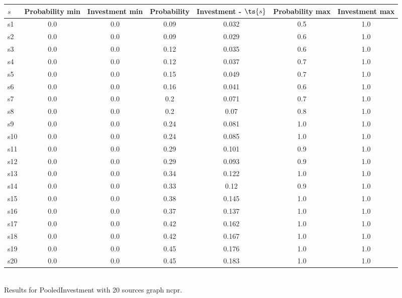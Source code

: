 \documentclass{article}
\begin{document}
\noindent\begin{tabular}{|l|c|c|c|c|c|c|}
\hline
$s$& Probability min & Investment min & Probability & Investment - $\ts{s}$ & Probability max & Investment max\\
\hline
s1 &0.0 & 0.0 & 0.09 & 0.032 & 0.5 & 1.0\\
\hline
s2 &0.0 & 0.0 & 0.09 & 0.029 & 0.6 & 1.0\\
\hline
s3 &0.0 & 0.0 & 0.12 & 0.035 & 0.6 & 1.0\\
\hline
s4 &0.0 & 0.0 & 0.12 & 0.037 & 0.7 & 1.0\\
\hline
s5 &0.0 & 0.0 & 0.15 & 0.049 & 0.7 & 1.0\\
\hline
s6 &0.0 & 0.0 & 0.16 & 0.041 & 0.6 & 1.0\\
\hline
s7 &0.0 & 0.0 & 0.2 & 0.071 & 0.7 & 1.0\\
\hline
s8 &0.0 & 0.0 & 0.2 & 0.07 & 0.8 & 1.0\\
\hline
s9 &0.0 & 0.0 & 0.24 & 0.081 & 1.0 & 1.0\\
\hline
s10 &0.0 & 0.0 & 0.24 & 0.085 & 1.0 & 1.0\\
\hline
s11 &0.0 & 0.0 & 0.29 & 0.101 & 0.9 & 1.0\\
\hline
s12 &0.0 & 0.0 & 0.29 & 0.093 & 0.9 & 1.0\\
\hline
s13 &0.0 & 0.0 & 0.34 & 0.122 & 1.0 & 1.0\\
\hline
s14 &0.0 & 0.0 & 0.33 & 0.12 & 0.9 & 1.0\\
\hline
s15 &0.0 & 0.0 & 0.38 & 0.145 & 1.0 & 1.0\\
\hline
s16 &0.0 & 0.0 & 0.37 & 0.137 & 1.0 & 1.0\\
\hline
s17 &0.0 & 0.0 & 0.42 & 0.162 & 1.0 & 1.0\\
\hline
s18 &0.0 & 0.0 & 0.42 & 0.167 & 1.0 & 1.0\\
\hline
s19 &0.0 & 0.0 & 0.45 & 0.176 & 1.0 & 1.0\\
\hline
s20 &0.0 & 0.0 & 0.45 & 0.183 & 1.0 & 1.0\\
\hline
\end{tabular}\\

\noindent Results for PooledInvestment with 20 sources graph ncpr.
\end{document}
